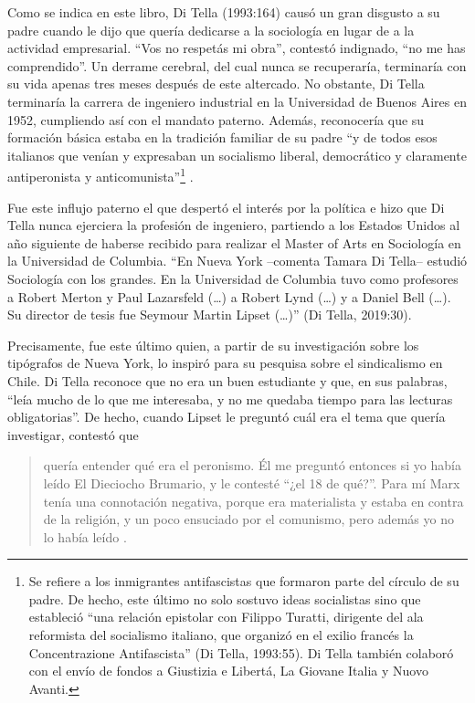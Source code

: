 Como se indica en este libro, Di Tella (1993:164) causó un gran disgusto a su padre cuando le dijo que quería dedicarse a la sociología en lugar de a la actividad empresarial. \enquote{Vos no respetás mi obra}, contestó indignado, \enquote{no me has comprendido}. Un derrame cerebral, del cual nunca se recuperaría, terminaría con su vida apenas tres meses después de este altercado. No obstante, Di Tella terminaría la carrera de ingeniero industrial en la Universidad de Buenos Aires en 1952, cumpliendo así con el mandato paterno. Además, reconocería que su formación básica estaba en la tradición familiar de su padre \enquote{y de todos esos italianos que venían y expresaban un socialismo liberal, democrático y claramente antiperonista y anticomunista}\footnote{Se refiere a los inmigrantes antifascistas que formaron parte del círculo de su padre. De hecho, este último no solo sostuvo ideas socialistas sino que estableció \enquote{una relación epistolar con Filippo Turatti, dirigente del ala reformista del socialismo italiano, que organizó en el exilio francés la Concentrazione Antifascista} (Di Tella, 1993:55). Di Tella también colaboró con el envío de fondos a Giustizia e Libertá, La Giovane Italia y Nuovo Avanti.} \parencite[270]{1553-CAMOU2009}.

Fue este influjo paterno el que despertó el interés por la política e hizo que Di Tella nunca ejerciera la profesión de ingeniero, partiendo a los Estados Unidos al año siguiente de haberse recibido para realizar el Master of Arts en Sociología en la Universidad de Columbia. \enquote{En Nueva York --comenta Tamara Di Tella-- estudió Sociología con los grandes. En la Universidad de Columbia tuvo como profesores a Robert Merton y Paul Lazarsfeld (\dots) a Robert Lynd (\dots) y a Daniel Bell (\dots). Su director de tesis fue Seymour Martin Lipset (\dots)} (Di Tella, 2019:30).

Precisamente, fue este último quien, a partir de su investigación sobre los tipógrafos de Nueva York, lo inspiró para su pesquisa sobre el sindicalismo en Chile. Di Tella reconoce que no era un buen estudiante y que, en sus palabras, \enquote{leía mucho de lo que me interesaba, y no me quedaba tiempo para las lecturas obligatorias}. De hecho, cuando Lipset le preguntó cuál era el tema que quería investigar, contestó que

\begin{quote}
quería entender qué era el peronismo. Él me preguntó entonces si yo había leído El Dieciocho Brumario, y le contesté \enquote{¿el 18 de qué?}. Para mí Marx tenía una connotación negativa, porque era materialista y estaba en contra de la religión, y un poco ensuciado por el comunismo, pero además yo no lo había leído \parencite[267]{1553-CAMOU2009}.
\end{quote}

